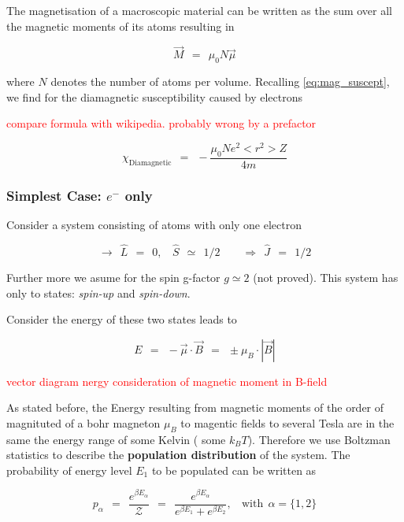 \documentclass[10pt]{report}
\numberwithin{equation}{chapter}
\begin{document}
The magnetisation of a macroscopic material can be written as the sum over all the magnetic moments of its atoms resulting in

\begin{equation}
  \vec{M} ~~=~~ \mu_0 N \vec{\mu}
\end{equation}

where $N$ denotes the number of atoms per volume. Recalling \ref{eq:mag_suscept}, we find for the diamagnetic susceptibility caused by electrons

\textcolor{red}{compare formula with wikipedia. probably wrong by a prefactor}

\begin{equation}
  \chi_\text{Diamagnetic} ~~=~~ -\frac{\mu_0 N e^2 <r^2> Z}{4m}
\end{equation}


\subsubsection{Simplest Case: $e^-$ only}

Consider a system consisting of atoms with only one electron

\begin{equation}
  \rightarrow ~~ \hat{L} ~~=~~0, ~~~~ \hat{S} ~~≃~~ 1/2 ~~~~~~~~~\Rightarrow ~~ \hat{J} ~~=~~ 1/2
\end{equation}

Further more we asume for the spin g-factor $g \simeq 2$ (not proved). This system has only to states: \textit{spin-up} and \textit{spin-down}.


Consider the energy of these two states leads to

\begin{equation}
  E ~~=~~ - \vec{\mu} \cdot \vec{B} ~~=~~ \pm \mu_B \cdot |\vec{B}|
\end{equation}

\textcolor{red}{ vector diagram nergy consideration of magnetic moment in B-field}

As stated before, the Energy resulting from magnetic moments of the order of magnituted of a bohr magneton $\mu_B$ to magentic fields to several Tesla are in the same the energy range of some Kelvin ( some $k_B T$). Therefore we use Boltzman statistics to describe the \textbf{population distribution} of the system. The probability of energy level $E_1$ to be populated can be written as

\begin{equation}
  p_\alpha ~~=~~ \frac{e^{\beta E_\alpha}}{\mathcal{Z}} ~~=~~ \frac{e^{\beta E_\alpha}}{e^{\beta E_1} + e^{\beta E_2}}, ~~~~ \text{with} ~~ \alpha = \{1,2\}
\end{equation}
\end{document}
